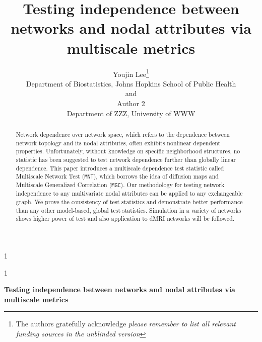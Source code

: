 \documentclass[12pt]{article}
\newcommand{\blind}{1}
\theoremstyle{definition}
\begin{document}
	
	
	\def\spacingset#1{\renewcommand{\baselinestretch}%
		{#1}\small\normalsize} \spacingset{1}
	
	
	
	\blind
	{
		\title{\bf Testing independence between networks and nodal attributes via multiscale metrics}
		\author{Youjin Lee\thanks{
				The authors gratefully acknowledge \textit{please remember to list all relevant funding sources in the unblinded version}}\hspace{.2cm}\\
			Department of Biostatistics, Johns Hopkins School of Public Health\\
			and \\
			Author 2 \\
			Department of ZZZ, University of WWW}
		\maketitle
	} \fi
	
	\blind
	{
		\bigskip
		\bigskip
		\bigskip
		\begin{center}
			{\LARGE\bf Testing independence between networks and nodal attributes via multiscale metrics}
		\end{center}
		\medskip
	} \fi
	
	
	\sloppy
	\bigskip
	\begin{abstract}
		Network dependence over network space, which refers to the dependence between network topology and its nodal attributes, often exhibits nonlinear dependent properties. Unfortunately, without knowledge on specific neighborhood structures, no statistic has been suggested to test network dependence further than globally linear dependence. This paper introduces a multiscale dependence test statistic called Multiscale Network Test (\texttt{MNT}), which borrows the idea of diffusion maps and Multiscale Generalized Correlation (\texttt{MGC}). Our methodology for testing network independence to any multivariate nodal attributes can be applied to any exchangeable graph. We prove the consistency of test statistics and demonstrate better performance than any other model-based, global test statistics. Simulation in a variety of networks shows higher power of test and also application to dMRI networks will be followed. 
	\end{abstract}
	
\end{document}
